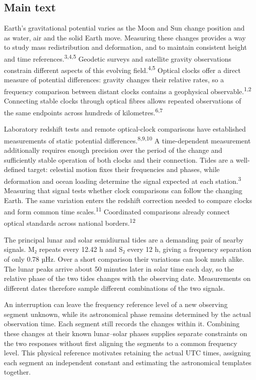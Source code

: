 \documentclass[
  10pt,
  a4paper,
]{article}
\begin{document}
\hypertarget{main-text}{%
\subsection{Main text}\label{main-text}}

Earth's gravitational potential varies as the Moon and Sun change
position and as water, air and the solid Earth move. Measuring these
changes provides a way to study mass redistribution and deformation, and
to maintain consistent height and time
references.\textsuperscript{3,4,5} Geodetic surveys and satellite
gravity observations constrain different aspects of this evolving
field.\textsuperscript{4,5} Optical clocks offer a direct measure of
potential differences: gravity changes their relative rates, so a
frequency comparison between distant clocks contains a geophysical
observable.\textsuperscript{1,2} Connecting stable clocks through
optical fibres allows repeated observations of the same endpoints across
hundreds of kilometres.\textsuperscript{6,7}

Laboratory redshift tests and remote optical-clock comparisons have
established measurements of static potential
differences.\textsuperscript{8,9,10} A time-dependent measurement
additionally requires enough precision over the period of the change and
sufficiently stable operation of both clocks and their connection. Tides
are a well-defined target: celestial motion fixes their frequencies and
phases, while deformation and ocean loading determine the signal
expected at each station.\textsuperscript{3} Measuring that signal tests
whether clock comparisons can follow the changing Earth. The same
variation enters the redshift correction needed to compare clocks and
form common time scales.\textsuperscript{11} Coordinated comparisons
already connect optical standards across national
borders.\textsuperscript{12}

The principal lunar and solar semidiurnal tides are a demanding pair of
nearby signals. M₂ repeats every 12.42 h and S₂ every 12 h, giving a
frequency separation of only 0.78 µHz. Over a short comparison their
variations can look much alike. The lunar peaks arrive about 50 minutes
later in solar time each day, so the relative phase of the two tides
changes with the observing date. Measurements on different dates
therefore sample different combinations of the two signals.

An interruption can leave the frequency reference level of a new
observing segment unknown, while its astronomical phase remains
determined by the actual observation time. Each segment still records
the changes within it. Combining these changes at their known
lunar--solar phases supplies separate constraints on the two responses
without first aligning the segments to a common frequency level. This
physical reference motivates retaining the actual UTC times, assigning
each segment an independent constant and estimating the astronomical
templates together.
\end{document}
